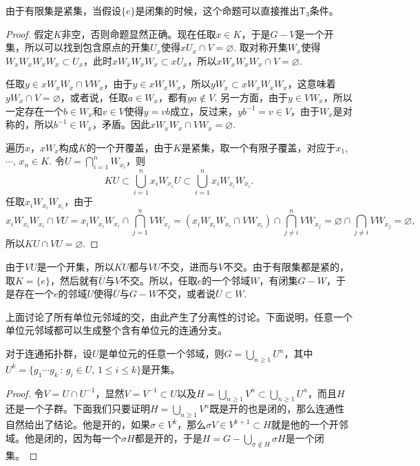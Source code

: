 由于有限集是紧集，当假设$\{e\}$是闭集的时候，这个命题可以直接推出$\mathsf{T}_3$条件。

\begin{proof}
	假定$K$非空，否则命题显然正确。现在任取$x\in K$，于是$G-V$是一个开集，所以可以找到包含原点的开集$U_x$使得$xU_x\cap V=\varnothing$. 取对称开集$W_x$使得$W_xW_xW_xW_x\subset U_x$，此时$xW_xW_xW_x\subset xU_x$，所以$xW_xW_xW_x\cap V=\varnothing$. 

	任取$y\in xW_xW_x\cap VW_x$，由于$y\in xW_xW_x$，所以$yW_x\subset xW_xW_xW_x$，这意味着$yW_x\cap V=\varnothing$，或者说，任取$a\in W_x$，都有$ya\not\in V$. 另一方面，由于$y\in VW_x$，所以一定存在一个$b\in W_x$和$v\in V$使得$y=vb$成立，反过来，$yb^{-1}=v\in V$，由于$W_x$是对称的，所以$b^{-1}\in W_x$，矛盾。因此$xW_xW_x\cap VW_x=\varnothing$.

	遍历$x$，$xW_x$构成$K$的一个开覆盖，由于$K$是紧集，取一个有限子覆盖，对应于$x_1$, $\cdots$, $x_n\in K$. 令$U=\bigcap_{i=1}^n W_{x_i}$，则
	\[
	KU\subset \bigcup_{i=1}^n {x_i}W_{x_i}U\subset \bigcup_{i=1}^n x_iW_{x_i}W_{x_i}.
	\]
	任取$x_iW_{x_i}W_{x_i}$，由于
	\[
		x_iW_{x_i}W_{x_i}\cap VU=x_iW_{x_i}W_{x_i}\cap \bigcap_{j=1}^n VW_{x_j}=(x_iW_{x_i}W_{x_i}\cap VW_{x_i})\cap \bigcap_{j\neq i}^n VW_{x_j}=\varnothing \cap \bigcap_{j\neq i} VW_{x_j}=\varnothing,
	\]
	所以$KU\cap VU=\varnothing$.
\end{proof}

由于$VU$是一个开集，所以$\overline{KU}$都与$VU$不交，进而与$V$不交。由于有限集都是紧的，取$K=\{e\}$，然后就有$\overline{U}$与$V$不交。所以，任取$e$的一个邻域$W$，有闭集$G-W$，于是存在一个$e$的邻域$U$使得$\overline{U}$与$G-W$不交，或者说$\overline{U}\subset W$.

上面讨论了所有单位元邻域的交，由此产生了分离性的讨论。下面说明，任意一个单位元邻域都可以生成整个含有单位元的连通分支。

\begin{lem}\label{lem:116}
对于连通拓扑群，设$U$是单位元的任意一个邻域，则$G=\bigcup_{n\geq 1}U^n$，其中$U^k=\{g_1\cdots g_k\,:\,g_i\in U,\, 1\leq i \leq k\}$是开集。
\end{lem}

\begin{proof}
令$V=U\cap U^{-1}$，显然$V=V^{-1}\subset U$以及$H=\bigcup_{n\geq 1}V^n\subset \bigcup_{n\geq 1}U^n$，而且$H$还是一个子群。下面我们只要证明$H=\bigcup_{n\geq 1}V^n$既是开的也是闭的，那么连通性自然给出了结论。他是开的，如果$\sigma\in V^k$，那么$\sigma V\in V^{k+1}\subset H$就是他的一个开邻域。他是闭的，因为每一个$\sigma H$都是开的，于是$H=G-\bigcup_{\sigma\notin H}\sigma H$是一个闭集。
\end{proof}

